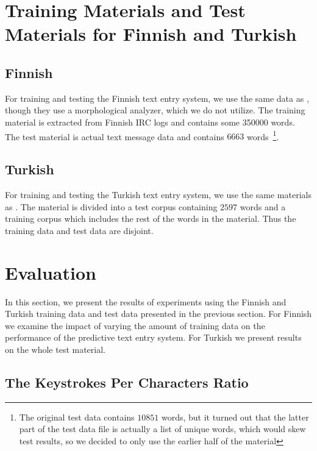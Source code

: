 \documentclass{llncs}
\begin{document}
\section{Training Materials and Test Materials for Finnish and Turkish}

\subsection{Finnish}

For training and testing the Finnish text entry system, we use the
same data as \cite{silfverberg/2011/cla}, though they use a
morphological analyzer, which we do not utilize. The training material is extracted from Finnish IRC logs and contains some 350000 words. The test material is actual text message data and contains $6663$ words~\footnote{The original test data contains $10851$ words, but it turned out that the latter part of the test data file is actually a list of unique words, which would skew test results, so we decided to only use the earlier half of the material}. 

\subsection{Turkish}

For training and testing the Turkish text entry system, we use the
same materials as \cite{Tantug:2010}. The material is divided into a
test corpus containing $2597$ words and a training corpus which
includes the rest of the words in the material. Thus the training data
and test data are disjoint.

\section{Evaluation}

In this section, we present the results of experiments using the
Finnish and Turkish training data and test data presented in the
previous section. For Finnish we examine the impact of varying the
amount of training data on the performance of the predictive text
entry system. For Turkish we present results on the whole test
material.

\subsection{The Keystrokes Per Characters Ratio}
\end{document}
